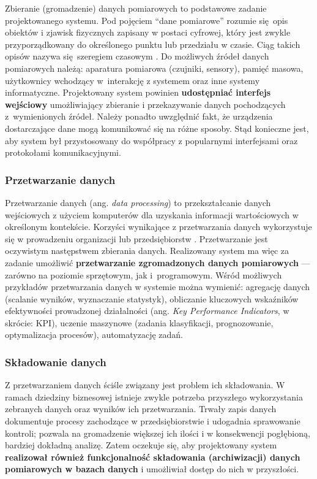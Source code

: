 \documentclass[a4paper, 12pt, twoside]{article}
\begin{document}
Zbieranie (gromadzenie) danych pomiarowych to podstawowe zadanie projektowanego systemu.
Pod pojęciem ``dane pomiarowe'' rozumie się opis obiektów i zjawisk fizycznych
zapisany w postaci cyfrowej, który jest zwykle przyporządkowany do określonego
punktu lub przedziału w czasie. Ciąg takich opisów nazywa się szeregiem czasowym \cite{time-series}.
Do możliwych źródeł danych pomiarowych należą: aparatura pomiarowa (czujniki, sensory),
pamięć masowa, użytkownicy wchodzący w~interakcję z systemem oraz inne systemy informatyczne.
Projektowany system powinien \textbf{udostępniać interfejs wejściowy} umożliwiający zbieranie
i przekazywanie danych pochodzących z~wymienionych źródeł. Należy ponadto uwzględnić
fakt, że urządzenia dostarczające dane mogą komunikować się na różne sposoby.
Stąd konieczne jest, aby system był przystosowany do współpracy z popularnymi
interfejsami oraz protokołami komunikacyjnymi.

\subsubsection{Przetwarzanie danych}

Przetwarzanie danych (ang. \emph{data processing}) to przekształcanie danych
wejściowych z użyciem komputerów dla uzyskania informacji
wartościowych w określonym kontekście. Korzyści wynikające z przetwarzania
danych wykorzystuje się w prowadzeniu organizacji lub przedsiębiorstw \cite{data-processing}.
Przetwarzanie jest oczywistym następstwem zbierania danych. Realizowany
system ma więc za zadanie umożliwić \textbf{przetwarzanie zgromadzonych danych pomiarowych}
--- zarówno na poziomie sprzętowym, jak i~programowym. Wśród możliwych przykładów
przetwarzania danych w systemie można wymienić: agregację danych
(scalanie wyników, wyznaczanie statystyk),
obliczanie kluczowych wskaźników efektywności prowadzonej działalności
(ang. \emph{Key Performance Indicators}, w skrócie: KPI), uczenie maszynowe
(zadania klasyfikacji, prognozowanie, optymalizacja procesów), automatyzację zadań.

\subsubsection{Składowanie danych}

Z przetwarzaniem danych ściśle związany jest problem ich składowania.
W ramach dziedziny biznesowej istnieje zwykle potrzeba przyszłego wykorzystania
zebranych danych oraz wyników ich przetwarzania. Trwały zapis danych dokumentuje
procesy zachodzące w przedsiębiorstwie i udogadnia sprawowanie kontroli; pozwala
na gromadzenie większej ich ilości i w konsekwencji pogłębioną, bardziej dokładną
analizę. Zatem oczekuje się, aby projektowany system \textbf{realizował również
      funkcjonalność składowania (archiwizacji) danych pomiarowych w bazach danych}
i umożliwiał dostęp do nich w przyszłości.
\end{document}

